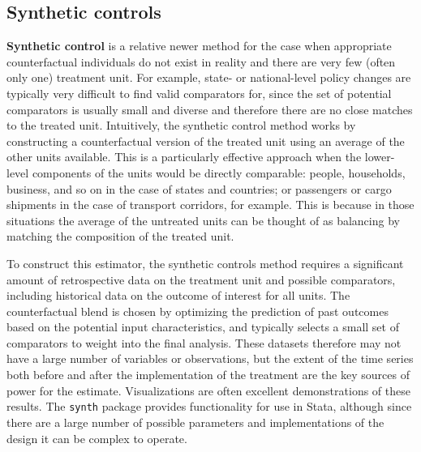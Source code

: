 \subsection{Synthetic controls}

\textbf{Synthetic control} is a relative newer method
for the case when appropriate counterfactual individuals
do not exist in reality and there are very few (often only one) treatment unit.\cite{abadie2015comparative}
For example, state- or national-level policy changes
are typically very difficult to find valid comparators for,
since the set of potential comparators is usually small and diverse
and therefore there are no close matches to the treated unit.
Intuitively, the synthetic control method works
by constructing a counterfactual version of the treated unit
using an average of the other units available.\cite{abadie2010synthetic}
This is a particularly effective approach
when the lower-level components of the units would be directly comparable:
people, households, business, and so on in the case of states and countries;
or passengers or cargo shipments in the case of transport corridors, for example.\cite{gobillon2016regional}
This is because in those situations the average of the untreated units
can be thought of as balancing by matching the composition of the treated unit.

To construct this estimator, the synthetic controls method requires
a significant amount of retrospective data on the treatment unit and possible comparators,
including historical data on the outcome of interest for all units.
The counterfactual blend is chosen by optimizing the prediction of past outcomes
based on the potential input characteristics,
and typically selects a small set of comparators to weight into the final analysis.
These datasets therefore may not have a large number of variables or observations,
but the extent of the time series both before and after the implementation
of the treatment are the key sources of power for the estimate.
Visualizations are often excellent demonstrations of these results.
The \texttt{synth} package provides functionality for use in Stata,
although since there are a large number of possible parameters
and implementations of the design it can be complex to operate.
